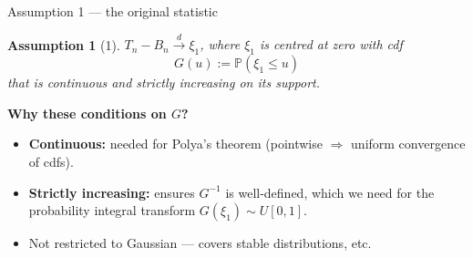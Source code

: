 \documentclass[10pt,aspectratio=169]{beamer}
\theoremstyle{plain}
\newtheorem{assumption}{Assumption}
\newcommand{\PR}{\mathbb{P}}
\newcommand{\dto}{\xrightarrow{d}}
\newcommand{\Tn}{T_{n}}
\newcommand{\Bn}{B_{n}}
\begin{document}
\begin{frame}{Assumption 1 --- the original statistic}

  \begin{assumption}[1]
    $\Tn - \Bn \dto \xi_1$, where $\xi_1$ is centred at zero with cdf
    \[
      G(u) := \PR(\xi_1 \le u)
    \]
    that is \alert{continuous and strictly increasing} on its support.
  \end{assumption}

  \bigskip

  \textbf{Why these conditions on $G$?}
  \begin{itemize}
    \setlength{\itemsep}{6pt}
    \item \textbf{Continuous:} needed for Polya's theorem
      (pointwise $\Rightarrow$ uniform convergence of cdfs).
    \item \textbf{Strictly increasing:} ensures $G^{-1}$ is well-defined, which we need
      for the probability integral transform $G(\xi_1) \sim U[0,1]$.
    \item Not restricted to Gaussian --- covers stable distributions, etc.
  \end{itemize}

\end{frame}

\end{document}
